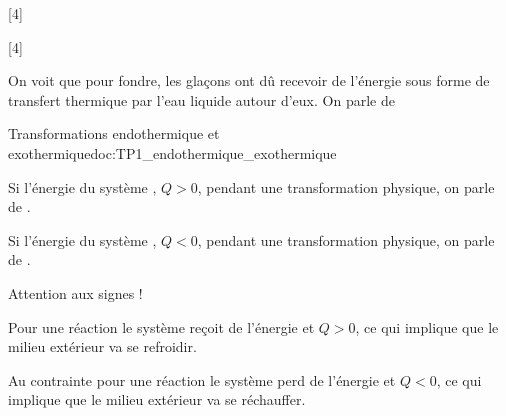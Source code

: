 [4]

[4]


\pasCorrection{\newpage}

On voit que pour fondre, les glaçons ont dû recevoir de l'énergie sous forme de transfert thermique par l'eau liquide autour d'eux.
On parle de 

\begin{doc}{Transformations endothermique et exothermique}{doc:TP1_endothermique_exothermique}
  \begin{importants}
    \begin{listePoints}
      \item Si l'énergie du système , $Q > 0$, pendant une transformation physique, on parle de .
      \item Si l'énergie du système , $Q < 0$, pendant une transformation physique, on parle de .
    \end{listePoints}
  \end{importants}
  \begin{center}
  \end{center}
  \attention Attention aux signes !
  
  \begin{listePoints}
    \item Pour une réaction  le système reçoit de l'énergie et $Q > 0$, ce qui implique que le milieu extérieur va se refroidir. 
    \item Au contrainte pour une réaction  le système perd de l'énergie et $Q < 0$, ce qui implique que le milieu extérieur va se réchauffer.
  \end{listePoints}
\end{doc}
